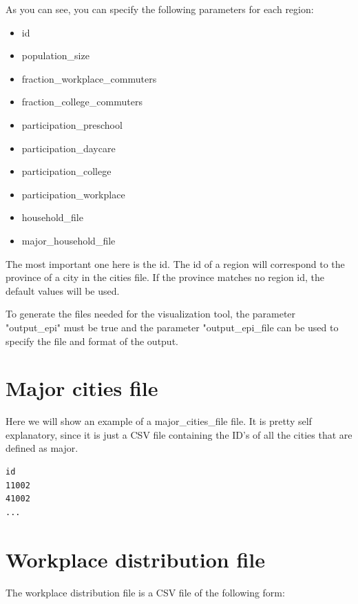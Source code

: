 As you can see, you can specify the following parameters for each region:

\begin{multicols}{2}
\begin{itemize}
    \item id
    \item population\_size
    \item fraction\_workplace\_commuters
    \item fraction\_college\_commuters
    \item participation\_preschool
    \item participation\_daycare
    \item participation\_college
    \item participation\_workplace
    \item household\_file
    \item major\_household\_file
\end{itemize}
\end{multicols}

The most important one here is the id. The id of a region will correspond to the province of a city in the cities file. If the province matches no region id, the default values will be used.

To generate the files needed for the visualization tool, the parameter "output\_epi" must be true and the parameter "output\_epi\_file can be used to specify the file and format of the output.

\section{Major cities file}
\label{section:major_cities}

Here we will show an example of a major\_cities\_file file. It is pretty self explanatory, since it is just a CSV file containing the ID's of all the cities that are defined as major.

\begin{lstlisting}[caption={major\_cities\_file example},captionpos=b]
id
11002
41002
...
\end{lstlisting}

\section{Workplace distribution file}

The workplace distribution file is a CSV file of the following form: 

